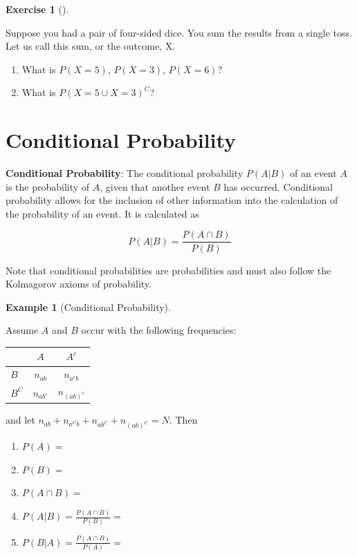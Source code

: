 \documentclass[
  letterpaper,
]{book}
\providecommand{\tightlist}{%
  \setlength{\itemsep}{0pt}\setlength{\parskip}{0pt}}\usepackage{longtable,booktabs,array}
\theoremstyle{definition}
\theoremstyle{definition}
\newtheorem{example}{Example}[chapter]
\theoremstyle{plain}
\theoremstyle{definition}
\newtheorem{exercise}{Exercise}[chapter]
\theoremstyle{plain}
\theoremstyle{plain}
\theoremstyle{remark}
\begin{document}
\leavevmode{}%
\begin{exercise}[]\label{exr-prob1}

Suppose you had a pair of four-sided dice. You sum the results from a
single toss. Let us call this sum, or the outcome, X.

\begin{enumerate}
\def\labelenumi{\arabic{enumi}.}
\tightlist
\item
  What is \(P(X = 5)\), \(P(X = 3)\), \(P(X = 6)\)?
\item
  What is \(P(X=5 \cup X = 3)^C\)?
\end{enumerate}

\end{exercise}

\hypertarget{conditional-probability}{%
\section{Conditional Probability}\label{conditional-probability}}

\textbf{Conditional Probability}: The conditional probability \(P(A|B)\)
of an event \(A\) is the probability of \(A\), given that another event
\(B\) has occurred. Conditional probability allows for the inclusion of
other information into the calculation of the probability of an event.
It is calculated as

\[P(A|B)=\frac{P(A\cap B)}{P(B)}\]

Note that conditional probabilities are probabilities and must also
follow the Kolmagorov axioms of probability.

\leavevmode{}%
\begin{example}[Conditional Probability]\label{exm-condprobexm1}

Assume \(A\) and \(B\) occur with the following frequencies: \(\quad\)

\begin{longtable}[]{@{}lcc@{}}
\toprule()
& \(A\) & \(A^c\) \\
\midrule()
\endhead
\(B\) & \(n_{ab}\) & \(n_{a^cb}\) \\
\(B^C\) & \(n_{ab^c}\) & \(n_{(ab)^c}\) \\
\bottomrule()
\end{longtable}

and let \(n_{ab}+n_{a^Cb}+n_{ab^C}+n_{(ab)^C}=N\). Then

\begin{enumerate}
\def\labelenumi{\arabic{enumi}.}
\tightlist
\item
  \(P(A)=\)
\item
  \(P(B)=\)
\item
  \(P(A\cap B)=\)
\item
  \(P(A|B)= \frac{P(A\cap B)}{P(B)}=\)
\item
  \(P(B|A)= \frac{P(A\cap B)}{P(A)}=\)
\end{enumerate}

\end{example}
\end{document}
